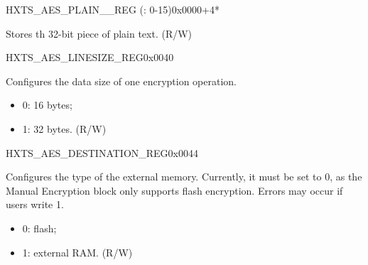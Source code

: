 

\begin{register}{H}{XTS\_AES\_PLAIN\_\_REG (: 0-15)}{0x0000+4*}\label{regdesc:XTSAESPLAINNREG}
%
\regnewline%
\begin{regdesc}\begin{reglist}
\label{fielddesc:XTSAESPLAINN}\item [XTS\_AES\_PLAIN\_\regindex{n}] Stores th 32-bit piece of plain text. (R/W)
\end{reglist}\end{regdesc}
\end{register}



\begin{register}{H}{XTS\_AES\_LINESIZE\_REG}{0x0040}\label{regdesc:XTSAESLINESIZEREG}
%
%
\regnewline%
\begin{regdesc}\begin{reglist}
\item [XTS\_AES\_LINESIZE] Configures the data size of one encryption operation. 
    \begin{itemize}
        \item 0: 16 bytes;
        \item 1: 32 bytes. (R/W)
    \end{itemize}
\end{reglist}\end{regdesc}
\end{register}


\begin{register}{H}{XTS\_AES\_DESTINATION\_REG}{0x0044}\label{regdesc:XTSAESDESTINATIONREG}
%
%
\regnewline%
\begin{regdesc}\begin{reglist}
\item [XTS\_AES\_DESTINATION] Configures the type of the external memory. Currently, it must be set to 0, as the Manual Encryption block only supports flash encryption. Errors may occur if users write 1.
\begin{itemize}
    \item 0: flash;
    \item 1: external RAM. (R/W)
\end{itemize} 

\end{reglist}\end{regdesc}
\end{register}


